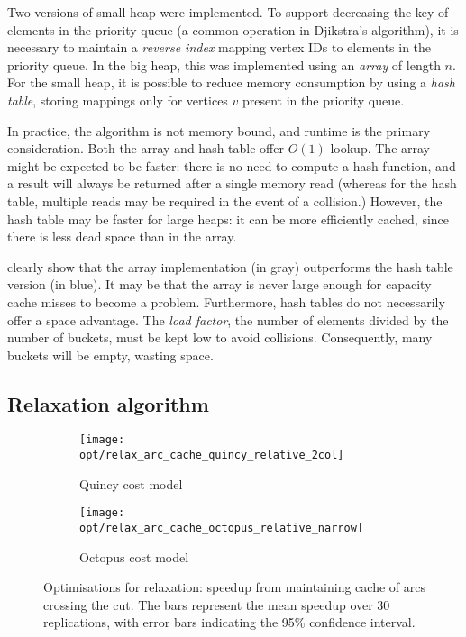 Two versions of small heap were implemented. To support decreasing the key of elements in the priority queue (a common operation in Djikstra's algorithm), it is necessary to maintain a \emph{reverse index} mapping vertex IDs to elements in the priority queue. In the big heap, this was implemented using an \emph{array} of length $n$. For the small heap, it is possible to reduce memory consumption by using a \emph{hash table}, storing mappings only for vertices $v$ present in the priority queue.

In practice, the algorithm is not memory bound, and runtime is the primary consideration. Both the array and hash table offer $O(1)$ lookup. The array might be expected to be faster: there is no need to compute a hash function, and a result will always be returned after a single memory read (whereas for the hash table, multiple reads may be required in the event of a collision.) However, the hash table may be faster for large heaps: it can be more efficiently cached, since there is less dead space than in the array.

 clearly show that the array implementation (in gray) outperforms the hash table version (in blue). It may be that the array is never large enough for capacity cache misses to become a problem. Furthermore, hash tables do not necessarily offer a space advantage. The \emph{load factor}, the number of elements divided by the number of buckets, must be kept low to avoid collisions. Consequently, many buckets will be empty, wasting space.


\subsection{Relaxation algorithm}

\begin{figure}
    \centering
    \begin{subfigure}[c]{0.49\textwidth}
        \texttt{[image: opt/relax\_arc\_cache\_quincy\_relative\_2col]}
        \caption{Quincy cost model}
    \end{subfigure}
    \begin{subfigure}[c]{0.49\textwidth}
        \texttt{[image: opt/relax\_arc\_cache\_octopus\_relative\_narrow]}
        \caption{Octopus cost model}
    \end{subfigure}
    \caption[Optimisations for relaxation]{Optimisations for relaxation: speedup from maintaining cache of arcs crossing the cut. The bars represent the mean speedup over 30 replications, with error bars indicating the 95\% confidence interval.}
    \label{fig:opt-relax-cache-arcs}
\end{figure}

